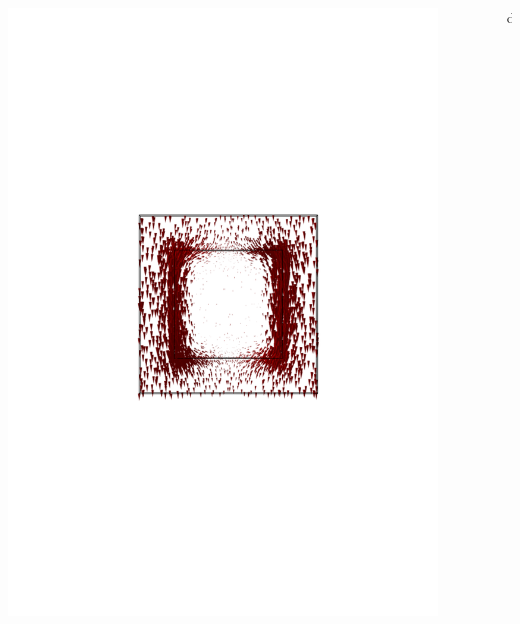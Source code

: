\documentclass[compress]{beamer}
\begin{document}
\begin{frame}
\begin{columns}[totalwidth=\textwidth]
\begin{column}{.35\textwidth}
	\includegraphics[width=0.9\textwidth]{Graphic/04_B3cubemagnefield3MHz_XZview.pdf}
	\end{column}
	\begin{column}{.35\textwidth}
	\centering	
	d

\end{column}
\end{columns}
\end{frame}
\end{document}
